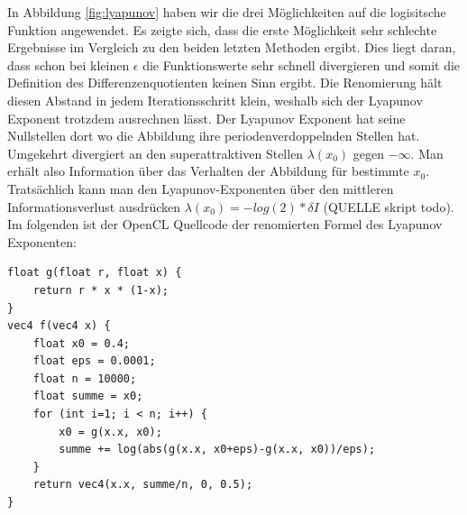 \documentclass{scrartcl}
\begin{document}
In Abbildung \ref{fig:lyapunov} haben wir die drei Möglichkeiten auf die logisitsche Funktion angewendet.
Es zeigte sich, dass die erste Möglichkeit sehr schlechte Ergebnisse im Vergleich zu den beiden letzten Methoden ergibt.
Dies liegt daran, dass schon bei kleinen $\epsilon$ die Funktionswerte sehr schnell divergieren und somit die Definition des Differenzenquotienten keinen Sinn ergibt.
Die Renomierung hält diesen Abstand in jedem Iterationsschritt klein, weshalb sich der Lyapunov Exponent trotzdem ausrechnen lässt.
Der Lyapunov Exponent hat seine Nullstellen dort wo die Abbildung ihre periodenverdoppelnden Stellen hat. Umgekehrt divergiert  an den superattraktiven Stellen $\lambda(x_0)$ gegen $-\infty$.
Man erhält also Information über das Verhalten der Abbildung für bestimmte $x_0$.
Tratsächlich kann man den Lyapunov-Exponenten über den mittleren Informationsverlust ausdrücken $\lambda(x_0)=-log(2)*\delta I$ (QUELLE skript todo).
Im folgenden ist der OpenCL Quellcode der renomierten Formel des Lyapunov Exponenten:
\begin{lstlisting}
float g(float r, float x) {
    return r * x * (1-x);
}
vec4 f(vec4 x) {
    float x0 = 0.4;
    float eps = 0.0001;
    float n = 10000;
    float summe = x0;
    for (int i=1; i < n; i++) {
        x0 = g(x.x, x0);
        summe += log(abs(g(x.x, x0+eps)-g(x.x, x0))/eps);
    }
    return vec4(x.x, summe/n, 0, 0.5);
}
\end{lstlisting}
\end{document}
